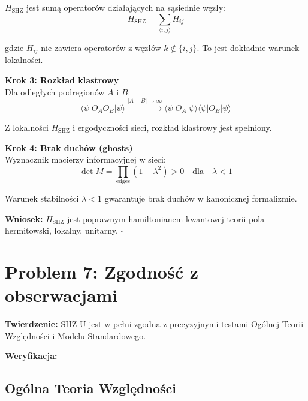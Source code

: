 \documentclass[11pt,a4paper]{article}
\begin{document}
$H_{\text{SHZ}}$ jest sumą operatorów działających na sąsiednie węzły:
\begin{equation}
H_{\text{SHZ}} = \sum_{\langle i,j \rangle} H_{ij}
\end{equation}

gdzie $H_{ij}$ nie zawiera operatorów z węzłów $k \notin \{i,j\}$. To jest dokładnie warunek lokalności.

\bigskip

\textbf{Krok 3: Rozkład klastrowy}\\

Dla odległych podregionów $A$ i $B$:
\begin{equation}
\langle \psi | O_A O_B | \psi \rangle \xrightarrow{|A-B| \to \infty} \langle \psi | O_A | \psi \rangle \langle \psi | O_B | \psi \rangle
\end{equation}

Z lokalności $H_{\text{SHZ}}$ i ergodyczności sieci, rozkład klastrowy jest spełniony.

\bigskip

\textbf{Krok 4: Brak duchów (ghosts)}\\

Wyznacznik macierzy informacyjnej w sieci:
\begin{equation}
\det M = \prod_{\text{edges}} (1 - \lambda^2) > 0 \quad \text{dla} \quad \lambda < 1
\end{equation}

Warunek stabilności $\lambda < 1$ gwarantuje brak duchów w kanonicznej formalizmie.

\bigskip

\textbf{Wniosek:} $H_{\text{SHZ}}$ jest poprawnym hamiltonianem kwantowej teorii pola -- hermitowski, lokalny, unitarny. $\square$

\bigskip

\section{Problem 7: Zgodność z obserwacjami}

\bigskip

\textbf{Twierdzenie:} SHZ-U jest w pełni zgodna z precyzyjnymi testami Ogólnej Teorii Względności i Modelu Standardowego.

\bigskip

\textbf{Weryfikacja:}

\bigskip

\subsection{Ogólna Teoria Względności}
\end{document}
